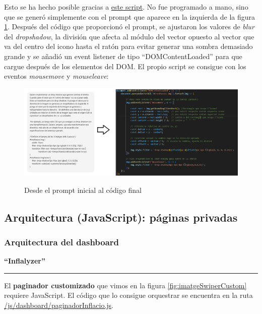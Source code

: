 \documentclass[a4paper,12pt]{report}
\begin{document}
	Esto se ha hecho posible gracias a  \href{https://github.com/blackcub3s/mercApp/blob/main/APP%20WEB/__frontend__produccio__/app/js/pas4/dropShadowReactiu.js}{este script}. No fue programado a mano, sino que se generó simplemente con el prompt que aparece en la izquierda de la figura \ref{fig:promptScriptDropShadow}. Después del código que proporcionó el prompt, se ajustaron los valores de \textit{blur} del \textit{dropshadow}, la división que afecta al módulo del vector opuesto al vector que va del centro del icono hasta el ratón para evitar generar una sombra demasiado grande y se añadió un event listener de tipo ``DOMContentLoaded'' para que cargue después de los elementos del DOM. El propio script se consigue con los eventos \textit{mousemove} y \textit{mouseleave}:
	
	\begin{figure}[H]
		\centering
		\caption{Desde el prompt inicial al código final}
		\includegraphics[width=1\linewidth]{img/promptScriptDropShadow}
		\label{fig:promptScriptDropShadow}
	\end{figure}
	
	
	\subsection{Arquitectura (JavaScript): páginas privadas}
	
	\subsubsection{Arquitectura del dashboard}
	\label{sec:paginadorJavascriptArquitectura}
	
	
	\noindent \textbf{``Inflalyzer''}
	\hrule
	\vspace{.5em}
	
	El \textbf{paginador customizado} que vimos en la figura \ref{fig:imatgeSwiperCustom} requiere JavaScript. El código que lo consigue orquestrar se encuentra en la ruta \href{https://github.com/blackcub3s/mercApp/blob/main/APP%20WEB/__frontend__produccio__/app/js/dashboard/paginadorInflacio.js}{/js/dashboard/paginadorInflacio.js}. 
	
\end{document}
